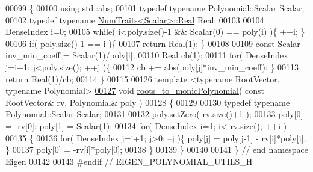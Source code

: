 \begin{DoxyCode}
00099 \{
00100   \textcolor{keyword}{using} std::abs;
00101   \textcolor{keyword}{typedef} \textcolor{keyword}{typename} Polynomial::Scalar Scalar;
00102   \textcolor{keyword}{typedef} \textcolor{keyword}{typename} \hyperlink{group___core___module_struct_eigen_1_1_num_traits}{NumTraits<Scalar>::Real} Real;
00103 
00104   DenseIndex i=0;
00105   \textcolor{keywordflow}{while}( i<poly.size()-1 && Scalar(0) == poly(i) )\{ ++i; \}
00106   \textcolor{keywordflow}{if}( poly.size()-1 == i )\{
00107     \textcolor{keywordflow}{return} Real(1); \}
00108 
00109   \textcolor{keyword}{const} Scalar inv\_min\_coeff = Scalar(1)/poly[i];
00110   Real cb(1);
00111   \textcolor{keywordflow}{for}( DenseIndex j=i+1; j<poly.size(); ++j )\{
00112     cb += abs(poly[j]*inv\_min\_coeff); \}
00113   \textcolor{keywordflow}{return} Real(1)/cb;
00114 \}
00115 
00126 \textcolor{keyword}{template} <\textcolor{keyword}{typename} RootVector, \textcolor{keyword}{typename} Polynomial>
\hyperlink{namespace_eigen_afbc3648f7ef67db3d5d04454fc1257fd}{00127} \textcolor{keywordtype}{void} \hyperlink{namespace_eigen_afbc3648f7ef67db3d5d04454fc1257fd}{roots\_to\_monicPolynomial}( \textcolor{keyword}{const} RootVector& rv, Polynomial& poly )
00128 \{
00129 
00130   \textcolor{keyword}{typedef} \textcolor{keyword}{typename} Polynomial::Scalar Scalar;
00131 
00132   poly.setZero( rv.size()+1 );
00133   poly[0] = -rv[0]; poly[1] = Scalar(1);
00134   \textcolor{keywordflow}{for}( DenseIndex i=1; i< rv.size(); ++i )
00135   \{
00136     \textcolor{keywordflow}{for}( DenseIndex j=i+1; j>0; --j )\{ poly[j] = poly[j-1] - rv[i]*poly[j]; \}
00137     poly[0] = -rv[i]*poly[0];
00138   \}
00139 \}
00140 
00141 \} \textcolor{comment}{// end namespace Eigen}
00142 
00143 \textcolor{preprocessor}{#endif // EIGEN\_POLYNOMIAL\_UTILS\_H}
\end{DoxyCode}
